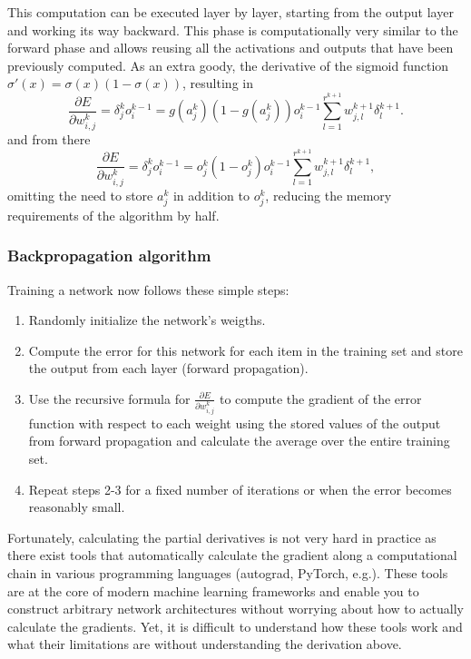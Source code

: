\documentclass[paper=6.14in:9.21in,pagesize=pdftex,11pt,twoside,openright]{scrbook}
\begin{document}
This computation can be executed layer by layer, starting from the output layer and working its way backward. This phase is computationally very similar to the forward phase and allows reusing all the activations and outputs that have been previously computed. As an extra goody, the derivative of the sigmoid function $\sigma'(x)=\sigma(x)(1-\sigma(x))$, resulting in
\begin{equation}
\frac{\partial E}{\partial w_{i,j}^k}=\delta_j^ko_i^{k-1}=g(a_j^k)(1-g(a_j^k))o_i^{k-1}\sum_{l=1}^{r^{k+1}}w_{j,l}^{k+1}\delta_l^{k+1}.
\end{equation}
and from there
\begin{equation}
\frac{\partial E}{\partial w_{i,j}^k}=\delta_j^ko_i^{k-1}=o_j^k(1-o_j^k)o_i^{k-1}\sum_{l=1}^{r^{k+1}}w_{j,l}^{k+1}\delta_l^{k+1},
\end{equation}
omitting the need to store $a_j^k$ in addition to $o_j^k$, reducing the memory requirements of the algorithm by half.

\subsubsection{Backpropagation algorithm}

Training a network now follows these simple steps:
\begin{enumerate}
\item Randomly initialize the network's weigths.
\item Compute the error for this network for each item in the training set and store the output from each layer (forward propagation).
\item Use the recursive formula for $\frac{\partial E}{\partial w^k_{i,j}}$ to compute the gradient of the error function with respect to each weight using the stored values of the output from forward propagation and calculate the average over the entire training set.
\item Repeat steps 2-3 for a fixed number of iterations or when the error becomes reasonably small.
\end{enumerate}

Fortunately, calculating the partial derivatives is not very hard in practice as there exist tools that automatically calculate the gradient along a computational chain in various programming languages (autograd, PyTorch, e.g.). These tools are at the core of modern machine learning frameworks and enable you to construct arbitrary network architectures without worrying about how to actually calculate the gradients. Yet, it is difficult to understand how these tools work and what their limitations are without understanding the derivation above. 
\end{document}
